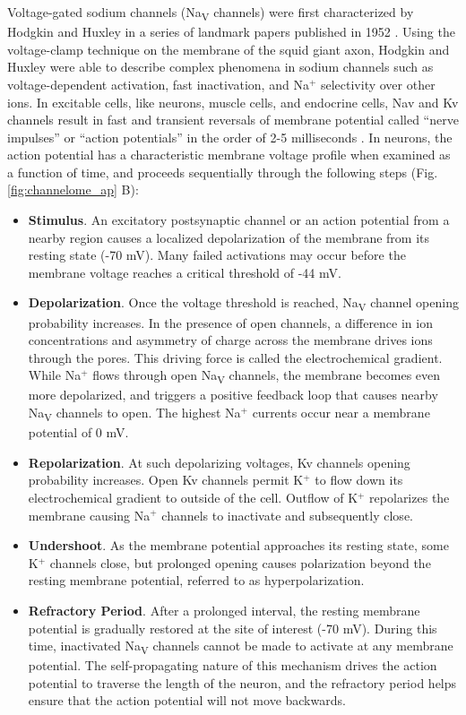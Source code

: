 \begin{refsection}
Voltage-gated sodium channels (Na\textsubscript{V} channels) were first characterized by Hodgkin and Huxley in a series of landmark papers published in 1952 \cite{Hodgkin:1952td,Hodgkin:1952vd,Hodgkin:1952um,Hodgkin:1952uf,Hodgkin:1952tr}.  Using the voltage-clamp technique on the membrane of the squid giant axon, Hodgkin and Huxley were able to describe complex phenomena in sodium channels such as voltage-dependent activation, fast inactivation, and Na$^+$ selectivity over other ions. In excitable cells, like neurons, muscle cells, and endocrine cells, Nav and Kv channels result in fast and transient reversals of membrane potential called ``nerve impulses'' or ``action potentials'' in the order of 2-5 milliseconds \cite{Bezanilla:2008ht,Hille:2001tw,Catterall:2012cd}. In neurons, the action potential has a characteristic membrane voltage profile when examined as a function of time, and proceeds sequentially through the following steps (Fig. \ref{fig:channelome_ap} B):
\begin{itemize}
\item \textbf{Stimulus}. An excitatory postsynaptic channel or an action potential from a nearby region causes a localized depolarization of the membrane from its resting state (-70 mV). Many failed activations may occur before the membrane voltage reaches a critical threshold of -44 mV.
\item \textbf{Depolarization}. Once the voltage threshold is reached, Na\textsubscript{V} channel opening probability increases. In the presence of open channels, a difference in ion concentrations and asymmetry of charge across the membrane drives ions through the pores. This driving force is called the electrochemical gradient. While Na$^+$ flows through open Na\textsubscript{V} channels, the membrane becomes even more depolarized, and triggers a positive feedback loop that causes nearby Na\textsubscript{V} channels to open. The highest Na$^+$ currents occur near a membrane potential of 0 mV.
\item \textbf{Repolarization}. At such depolarizing voltages, Kv channels opening probability increases. Open Kv channels permit K$^+$ to flow down its electrochemical gradient to outside of the cell. Outflow of K$^+$ repolarizes the membrane causing Na$^+$ channels to inactivate and subsequently close.
\item \textbf{Undershoot}. As the membrane potential approaches its resting state, some K$^+$ channels close, but prolonged opening causes polarization beyond the resting membrane potential, referred to as hyperpolarization.
\item \textbf{Refractory Period}. After a prolonged interval, the resting membrane potential is gradually restored at the site of interest (-70 mV). During this time, inactivated Na\textsubscript{V} channels cannot be made to activate at any membrane potential. The self-propagating nature of this mechanism drives the action potential to traverse the length of the neuron, and the refractory period helps ensure that the action potential will not move backwards.  
\end{itemize}


\end{refsection}
